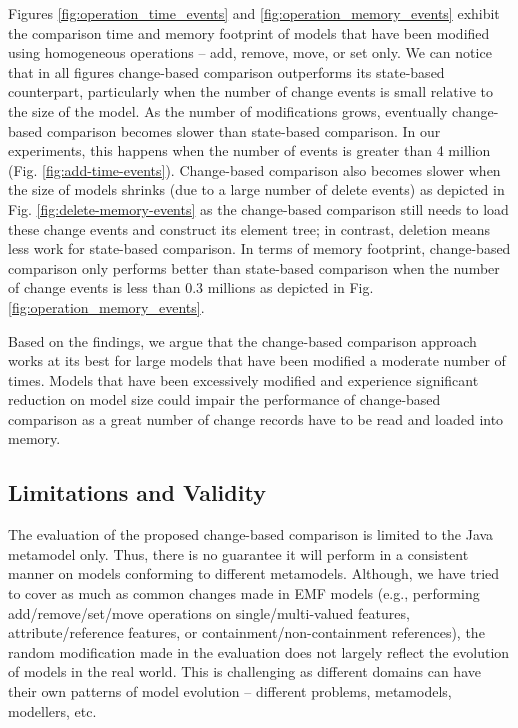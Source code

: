 \documentclass{jot}
\newcommand{\dk}[1]{\textcolor{blue}{\textbf{[Dimitris: #1]}}}
\begin{document}
    Figures \ref{fig:operation_time_events} and \ref{fig:operation_memory_events} exhibit the comparison time and memory footprint of models that have been modified using homogeneous operations -- \textsf{add}, \textsf{remove}, \textsf{move}, or \textsf{set} only. We can notice that in all figures change-based comparison outperforms its state-based counterpart, particularly when the number of change events is small relative to the size of the model. As the number of modifications grows, eventually change-based comparison becomes slower than state-based comparison. In our experiments, this happens when the number of events is greater than 4 million (Fig. \ref{fig:add-time-events}). Change-based comparison also becomes slower when the size of models shrinks (due to a large number of delete events) as depicted in Fig. \ref{fig:delete-memory-events} as the change-based comparison still needs to load these change events and construct its element tree; in contrast, deletion means less work for state-based comparison. In terms of memory footprint, change-based comparison only performs better than state-based comparison when the number of change events is less than 0.3 millions as depicted in Fig. \ref{fig:operation_memory_events}.
    
    Based on the findings, we argue that the change-based comparison approach works at its best for large models that have been modified a moderate number of times. Models that have been excessively modified and experience significant reduction on model size could impair the performance of change-based comparison as a great number of change records have to be read and loaded into memory. 
    
    \subsection{Limitations and Validity}
    \label{sec:limitation_and_Threat_to_validity}
    The evaluation of the proposed change-based comparison is limited to the Java metamodel only. Thus, there is no guarantee it will perform in a consistent manner on models conforming to different metamodels. Although, we have tried to cover as much as common changes made in EMF models (e.g., performing \textsf{add}/\textsf{remove}/\textsf{set}/\textsf{move} operations on \textsf{single}/\textsf{multi}-\textsf{valued} features, \textsf{attribute}/\textsf{reference} features, or \textsf{containment}/\textsf{non}-\textsf{containment} references), the random modification made in the evaluation does not largely reflect the evolution of models in the real world. This is challenging as different domains can have their own patterns of model evolution -- different problems, metamodels, modellers, etc.
    
\end{document}
